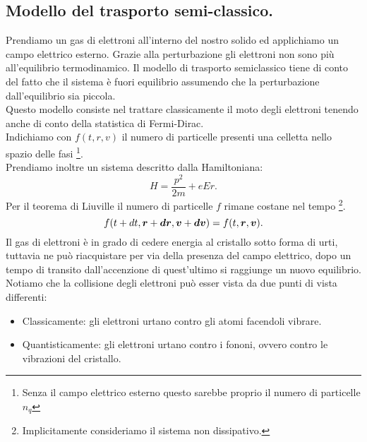 \subsection{Modello del trasporto semi-classico.}
\label{subsubsec:Modello del trasporto semi-classico.}
Prendiamo un gas di elettroni all'interno del nostro solido ed applichiamo un campo elettrico esterno. Grazie alla perturbazione gli elettroni non sono più all'equilibrio termodinamico.
Il modello di trasporto semiclassico tiene di conto del fatto che il sistema è fuori equilibrio assumendo che la perturbazione dall'equilibrio sia piccola.\\
Questo modello consiste nel trattare classicamente il moto degli elettroni tenendo anche di conto della statistica di Fermi-Dirac.\\
Indichiamo con $f( t, r, v) $ il numero di particelle presenti una celletta nello spazio delle fasi \footnote{Senza il campo elettrico esterno questo sarebbe proprio il numero di particelle $n_q$}.\\
Prendiamo inoltre un sistema descritto dalla Hamiltoniana:
\[
	H = \frac{p^2}{2m} + eEr
.\] 
Per il teorema di Liuville il numero di particelle $f$ rimane costane nel tempo \footnote{Implicitamente consideriamo il sistema non dissipativo.}.
\[
	f( t+dt,\boldsymbol{r}+\boldsymbol{dr}, \boldsymbol{v}+\boldsymbol{dv})
	= 
	f( t, \boldsymbol{r}, \boldsymbol{v}) 
.\] 
Il gas di elettroni è in grado di cedere energia al cristallo sotto forma di urti, tuttavia ne può riacquistare per via della presenza del campo elettrico, dopo un tempo di transito dall'accenzione di quest'ultimo si raggiunge un nuovo equilibrio.\\
Notiamo che la collisione degli elettroni può esser vista da due punti di vista differenti:
\begin{itemize}
	\item Classicamente: gli elettroni urtano contro gli atomi facendoli vibrare.
	\item Quantisticamente: gli elettroni urtano contro i fononi, ovvero contro le
		vibrazioni del cristallo.
\end{itemize}
